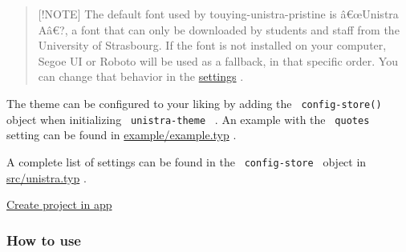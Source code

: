 \begin{Shaded}
\begin{Highlighting}[]

\NormalTok{  ),}
\NormalTok{)}





\end{Highlighting}
\end{Shaded}

\begin{quote}
{[}!NOTE{]} The default font used by touying-unistra-pristine is
â€œUnistra Aâ€?, a font that can only be downloaded by students and
staff from the University of Strasbourg. If the font is not installed on
your computer, Segoe UI or Roboto will be used as a fallback, in that
specific order. You can change that behavior in the
\href{https://github.com/typst/packages/raw/main/packages/preview/touying-unistra-pristine/1.2.0/\#Configuration}{settings}
.
\end{quote}

The theme can be configured to your liking by adding the
\texttt{\ config-store()\ } object when initializing
\texttt{\ unistra-theme\ } . An example with the \texttt{\ quotes\ }
setting can be found in
\href{https://github.com/typst/packages/raw/main/packages/preview/touying-unistra-pristine/1.2.0/example/example.typ}{example/example.typ}
.

A complete list of settings can be found in the
\texttt{\ config-store\ } object in
\href{https://github.com/typst/packages/raw/main/packages/preview/touying-unistra-pristine/1.2.0/src/unistra.typ}{src/unistra.typ}
.

\href{/app?template=touying-unistra-pristine&version=1.2.0}{Create
project in app}

\subsubsection{How to use}\label{how-to-use}

